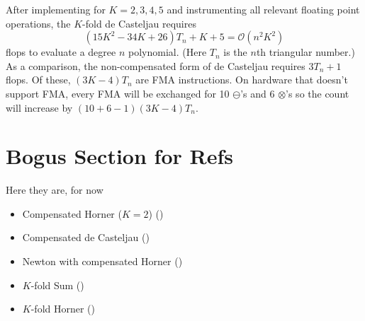 \documentclass[letterpaper,10pt]{article}
\begin{document}
After implementing for \(K = 2, 3, 4, 5\) and instrumenting all relevant
floating point operations, the \(K\)-fold de Casteljau requires
\[(15K^2 - 34K + 26)T_n + K + 5 =
\mathcal{O}\left(n^2 K^2\right)\]
flops to evaluate a degree \(n\) polynomial. (Here \(T_n\) is the
\(n\)th triangular number.) As a comparison, the non-compensated form of
de Casteljau requires \(3 T_n + 1\) flops. Of these, \((3K - 4)T_n\) are
FMA instructions. On hardware that doesn't support FMA,
every FMA will be exchanged for 10 \(\ominus\)'s and 6 \(\otimes\)'s so the
count will increase by \((10 + 6 - 1)(3K - 4)T_n\).

\section{Bogus Section for Refs}

Here they are, for now
\begin{itemize}
  \item Compensated Horner (\(K = 2\)) (\cite{langlois_et_al:DSP:2006:442})
  \item Compensated de Casteljau (\cite{Jiang2010})
  \item Newton with compensated Horner (\cite{Graillat2008})
  \item \(K\)-fold Sum (\cite{Ogita2005})
  \item \(K\)-fold Horner (\cite{Graillat2009})
\end{itemize}



\end{document}
